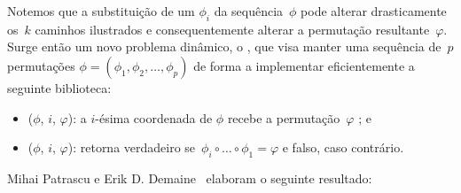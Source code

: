 Notemos que a substituição de um $\phi_i$ da sequência~$\phi$ pode alterar drasticamente os~$k$ caminhos ilustrados e consequentemente alterar a permutação resultante~$\varphi$. Surge então um novo problema dinâmico, o , que visa manter uma sequência de~$p$ permutações ${\phi=(\phi_1, \phi_2, \ldots, \phi_p)}$ de forma a implementar eficientemente a seguinte biblioteca:
\begin{itemize}
\item \VPSPupdate($\phi$, $i$, $\varphi$): a $i$-ésima coordenada de $\phi$ recebe a permutação~$\varphi$ ; e
\item \VPSPverify($\phi$, $i$, $\varphi$): retorna verdadeiro se~$\phi_i\circ \ldots\circ \phi_1 = \varphi$ e falso, caso contrário.
\end{itemize}

Mihai Patrascu e Erik D. Demaine~\cite{lowerBoundPatrascu} elaboram o seguinte resultado:

\begin{theorem}
\label{theo:lim}
\end{theorem}

